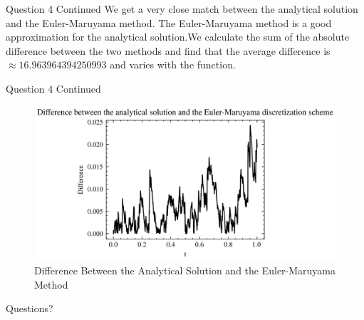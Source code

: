 \documentclass[compress,12pt]{beamer}
\begin{document}
\begin{frame}{Question 4 Continued}
    We get a very close match between the analytical solution and the Euler-Maruyama method. The Euler-Maruyama method is a good approximation for the analytical solution.We calculate
    the sum of the absolute difference between the two methods and find that the average difference is $\approx 16.963964394250993$ and varies with the function.
\end{frame}

\begin{frame}{Question 4 Continued}
    \begin{figure}
        \centering
        \includegraphics{imgs/difference.png}
        \caption{Difference Between the Analytical Solution and the Euler-Maruyama Method}
        \label{fig:question4}
    \end{figure}
\end{frame}

\End
\begin{frame}
      \centering
      Questions?
\end{frame}
\end{document}
